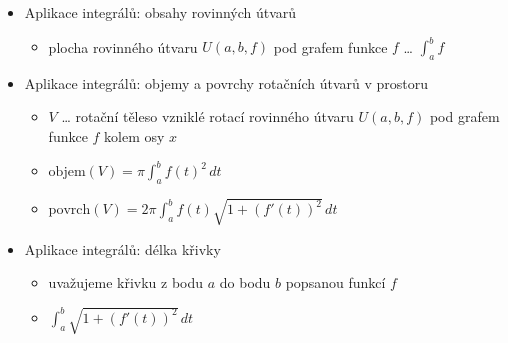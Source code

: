 \begin{itemize}
\begin{itemize}
\begin{itemize}
\item řada $\sum_{k=1}^\infty f(k)$ konverguje $\iff\lim_{b\to+\infty}\int_1^b f\lt +\infty$
\end{itemize}
\item přesný postup pro odhad součtu řady je potřeba nacvičit
\begin{practicebox}
Odhad součtu řady přes integrál je výpočetní dovednost - vyřeš pár konkrétních příkladů.
\end{practicebox}
\end{itemize}
\item Aplikace integrálů: obsahy rovinných útvarů
\begin{itemize}
\item plocha rovinného útvaru $U(a,b,f)$ pod grafem funkce $f$ \dots{} $\int_a^b f$
\end{itemize}
\item Aplikace integrálů: objemy a povrchy rotačních útvarů v prostoru
\begin{itemize}
\item $V$ \dots{} rotační těleso vzniklé rotací rovinného útvaru $U(a,b,f)$ pod grafem funkce $f$ kolem osy $x$
\item $\mathrm{objem}(V)=\pi\int_a^b f(t)^2\,dt$
\item $\mathrm{povrch}(V)=2\pi\int_a^b f(t)\sqrt{1+(f'(t))^2}\,dt$
\end{itemize}
\item Aplikace integrálů: délka křivky
\begin{itemize}
\item uvažujeme křivku z bodu $a$ do bodu $b$ popsanou funkcí $f$
\item $\int_a^b\sqrt{1+(f'(t))^2}\,dt$
\end{itemize}
\end{itemize}
